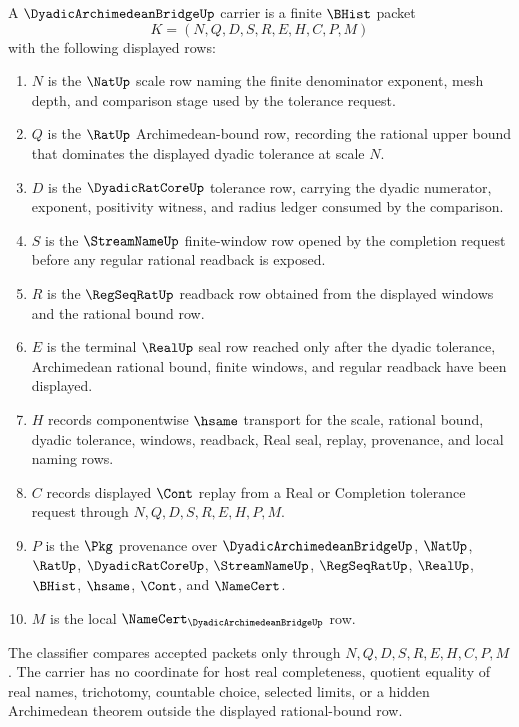\begin{definition}
\label{def:dyadic-archimedean-bridge-carrier}
A $\DyadicArchimedeanBridgeUp$ carrier is a finite $\BHist$ packet
$$
K=(N,Q,D,S,R,E,H,C,P,M)
$$
with the following displayed rows:
\begin{enumerate}
\item $N$ is the $\NatUp$ scale row naming the finite denominator exponent, mesh depth, and comparison stage used by the tolerance request.
\item $Q$ is the $\RatUp$ Archimedean-bound row, recording the rational upper bound that dominates the displayed dyadic tolerance at scale $N$.
\item $D$ is the $\DyadicRatCoreUp$ tolerance row, carrying the dyadic numerator, exponent, positivity witness, and radius ledger consumed by the comparison.
\item $S$ is the $\StreamNameUp$ finite-window row opened by the completion request before any regular rational readback is exposed.
\item $R$ is the $\RegSeqRatUp$ readback row obtained from the displayed windows and the rational bound row.
\item $E$ is the terminal $\RealUp$ seal row reached only after the dyadic tolerance, Archimedean rational bound, finite windows, and regular readback have been displayed.
\item $H$ records componentwise $\hsame$ transport for the scale, rational bound, dyadic tolerance, windows, readback, Real seal, replay, provenance, and local naming rows.
\item $C$ records displayed $\Cont$ replay from a Real or Completion tolerance request through $N,Q,D,S,R,E,H,P,M$.
\item $P$ is the $\Pkg$ provenance over $\DyadicArchimedeanBridgeUp$, $\NatUp$, $\RatUp$, $\DyadicRatCoreUp$, $\StreamNameUp$, $\RegSeqRatUp$, $\RealUp$, $\BHist$, $\hsame$, $\Cont$, and $\NameCert$.
\item $M$ is the local $\NameCert_{\DyadicArchimedeanBridgeUp}$ row.
\end{enumerate}
The classifier compares accepted packets only through $N,Q,D,S,R,E,H,C,P,M$. The carrier has no coordinate for host real completeness, quotient equality of real names, trichotomy, countable choice, selected limits, or a hidden Archimedean theorem outside the displayed rational-bound row.
\end{definition}

